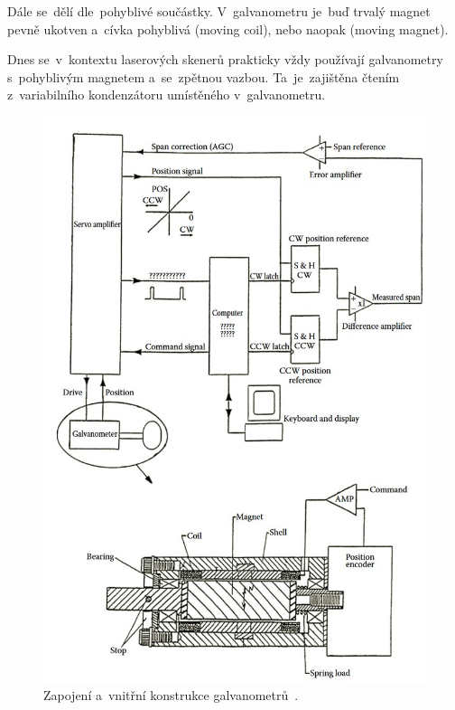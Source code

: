 Dále se~dělí dle~pohyblivé součástky. V~galvanometru je~buď trvalý magnet pevně ukotven a~cívka pohyblivá (moving coil), nebo naopak (moving magnet). %

Dnes se~v~kontextu laserových skenerů prakticky vždy používají galvanometry s~pohyblivým magnetem a~se~zpětnou vazbou. Ta~je~zajištěna čtením z~variabilního kondenzátoru umístěného v~galvanometru.

\begin{figure}[htb]
  \centering
  \includegraphics[width=1\textwidth]{img/galvanometer-detail.jpg}
  \caption{\label{fig:galvanometer-detail} Zapojení a~vnitřní konstrukce galvanometrů~\cite{scanning-handbook}.}
\end{figure}

